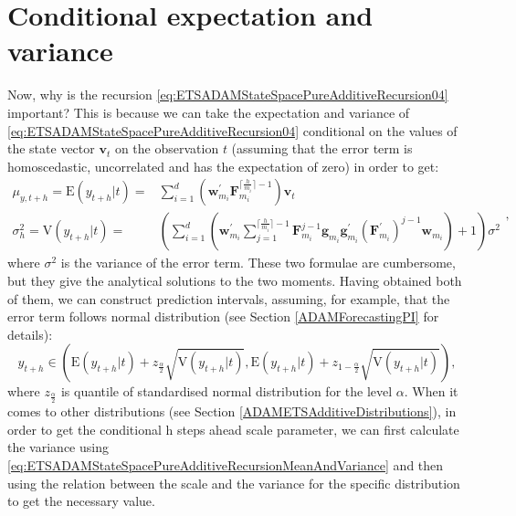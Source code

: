 \documentclass[
]{book}
\theoremstyle{definition}
\theoremstyle{definition}
\theoremstyle{definition}
\theoremstyle{definition}
\theoremstyle{remark}
\begin{document}
\hypertarget{pureAdditiveExpectationAndVariance}{%
\section{Conditional expectation and variance}\label{pureAdditiveExpectationAndVariance}}

Now, why is the recursion \eqref{eq:ETSADAMStateSpacePureAdditiveRecursion04} important? This is because we can take the expectation and variance of \eqref{eq:ETSADAMStateSpacePureAdditiveRecursion04} conditional on the values of the state vector \(\mathbf{v}_{t}\) on the observation \(t\) (assuming that the error term is homoscedastic, uncorrelated and has the expectation of zero) in order to get:
\begin{equation}
  \begin{aligned}
    \mu_{y,t+h} = \text{E}(y_{t+h}|t) = & \sum_{i=1}^d \left(\mathbf{w}_{m_i}^\prime \mathbf{F}_{m_i}^{\lceil\frac{h}{m_i}\rceil-1} \right) \mathbf{v}_{t} \\
    \sigma^2_{h} = \text{V}(y_{t+h}|t) = & \left( \sum_{i=1}^d \left(\mathbf{w}_{m_i}^\prime \sum_{j=1}^{\lceil\frac{h}{m_i}\rceil-1} \mathbf{F}_{m_i}^{j-1} \mathbf{g}_{m_i} \mathbf{g}^\prime_{m_i} (\mathbf{F}_{m_i}^\prime)^{j-1} \mathbf{w}_{m_i} \right) + 1 \right) \sigma^2
  \end{aligned},
  \label{eq:ETSADAMStateSpacePureAdditiveRecursionMeanAndVariance}
\end{equation}
where \(\sigma^2\) is the variance of the error term. These two formulae are cumbersome, but they give the analytical solutions to the two moments. Having obtained both of them, we can construct prediction intervals, assuming, for example, that the error term follows normal distribution (see Section \ref{ADAMForecastingPI} for details):
\begin{equation}
    y_{t+h} \in \left( \text{E}(y_{t+h}|t) + z_{\frac{\alpha}{2}} \sqrt{\text{V}(y_{t+h}|t)}, \text{E}(y_{t+h}|t) + z_{1-\frac{\alpha}{2}} \sqrt{\text{V}(y_{t+h}|t)} \right),
  \label{eq:ETSADAMStateSpacePureAdditivePredictionInterval}
\end{equation}
where \(z_{\frac{\alpha}{2}}\) is quantile of standardised normal distribution for the level \(\alpha\). When it comes to other distributions (see Section \ref{ADAMETSAdditiveDistributions}), in order to get the conditional h steps ahead scale parameter, we can first calculate the variance using \eqref{eq:ETSADAMStateSpacePureAdditiveRecursionMeanAndVariance} and then using the relation between the scale and the variance for the specific distribution \citep[see discussion in Chapter 3 of][]{SvetunkovSBA} to get the necessary value.
\end{document}
